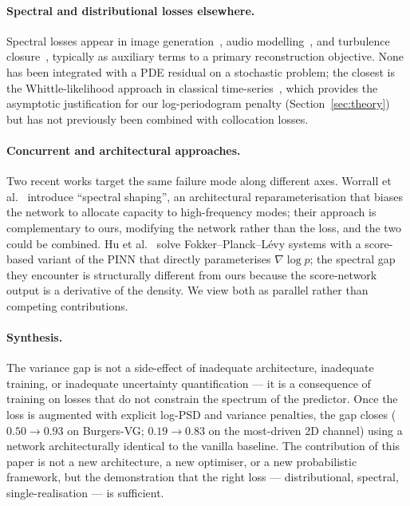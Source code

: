 \documentclass[review,12pt]{elsarticle}
\begin{document}
\paragraph{Spectral and distributional losses elsewhere.}
Spectral losses appear in image generation~\cite{Durall2020}, audio
modelling~\cite{Engel2020DDSP}, and turbulence
closure~\cite{Kim2024Turb}, typically as auxiliary terms to a
primary reconstruction objective. None has been integrated with a
PDE residual on a stochastic problem; the closest is the
Whittle-likelihood approach in classical
time-series~\cite{Whittle1953}, which provides the asymptotic
justification for our log-periodogram penalty
(Section~\ref{sec:theory}) but has not previously been combined
with collocation losses.

\paragraph{Concurrent and architectural approaches.}
Two recent works target the same failure mode along different axes.
Worrall et al.~\cite{Worrall2025SpectralShaping} introduce
``spectral shaping'', an architectural reparameterisation that
biases the network to allocate capacity to high-frequency modes;
their approach is complementary to ours, modifying the network
rather than the loss, and the two could be combined. Hu et
al.~\cite{Hu2024ScoreFPINN} solve Fokker--Planck--L\'evy systems
with a score-based variant of the PINN that directly parameterises
\(\nabla \log p\); the spectral gap they encounter is structurally
different from ours because the score-network output is a derivative
of the density. We view both as parallel rather than competing
contributions.

\paragraph{Synthesis.}
The variance gap is not a side-effect of inadequate architecture,
inadequate training, or inadequate uncertainty quantification ---
it is a consequence of training on losses that do not constrain
the spectrum of the predictor. Once the loss is augmented with
explicit log-PSD and variance penalties, the gap closes
(\(0.50\to 0.93\) on Burgers-VG; \(0.19 \to 0.83\) on the
most-driven 2D channel) using a network architecturally identical
to the vanilla baseline. The contribution of this paper is not a
new architecture, a new optimiser, or a new probabilistic
framework, but the demonstration that the right loss ---
distributional, spectral, single-realisation --- is sufficient.
\end{document}
